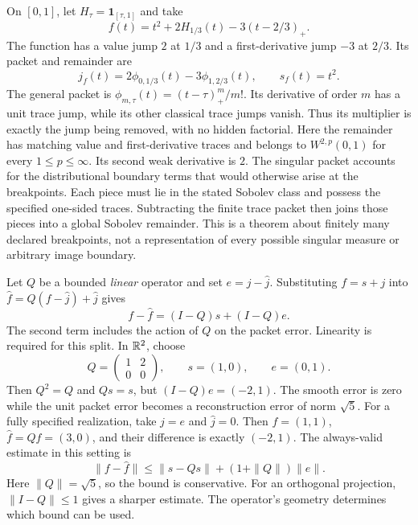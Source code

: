 On $[0,1]$, let $H_\tau=\mathbf1_{[\tau,1]}$ and take
\[
f(t)=t^2+2H_{1/3}(t)-3(t-2/3)_+.
\]
The function has a value jump $2$ at $1/3$ and a first-derivative jump $-3$ at $2/3$. Its packet and remainder are
\[
j_f(t)=2\phi_{0,1/3}(t)-3\phi_{1,2/3}(t),\qquad s_f(t)=t^2.
\]
The general packet is $\phi_{m,\tau}(t)=(t-\tau)_+^m/m!$. Its derivative of order $m$ has a unit trace jump, while its other classical trace jumps vanish. Thus its multiplier is exactly the jump being removed, with no hidden factorial.
Here the remainder has matching value and first-derivative traces and belongs to $W^{2,p}(0,1)$ for every $1\le p\le\infty$. Its second weak derivative is $2$. The singular packet accounts for the distributional boundary terms that would otherwise arise at the breakpoints.
Each piece must lie in the stated Sobolev class and possess the specified one-sided traces. Subtracting the finite trace packet then joins those pieces into a global Sobolev remainder. This is a theorem about finitely many declared breakpoints, not a representation of every possible singular measure or arbitrary image boundary.

Let $Q$ be a bounded \emph{linear} operator and set $e=j-\widehat j$. Substituting $f=s+j$ into $\widehat f=Q(f-\widehat j)+\widehat j$ gives
\[
f-\widehat f=(I-Q)s+(I-Q)e.
\]
The second term includes the action of $Q$ on the packet error. Linearity is required for this split.
In $\mathbb R^2$, choose
\[
Q=\begin{pmatrix}1&2\\0&0\end{pmatrix},\qquad
s=(1,0),\qquad e=(0,1).
\]
Then $Q^2=Q$ and $Qs=s$, but $(I-Q)e=(-2,1)$. The smooth error is zero while the unit packet error becomes a reconstruction error of norm $\sqrt5$.
For a fully specified realization, take $j=e$ and $\widehat j=0$. Then $f=(1,1)$, $\widehat f=Qf=(3,0)$, and their difference is exactly $(-2,1)$.
The always-valid estimate in this setting is
\[
\|f-\widehat f\|\leq\|s-Qs\|+(1+\|Q\|)\|e\|.
\]
Here $\|Q\|=\sqrt5$, so the bound is conservative. For an orthogonal projection, $\|I-Q\|\le1$ gives a sharper estimate. The operator's geometry determines which bound can be used.

